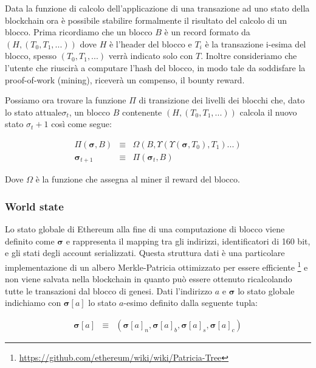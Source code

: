 	Data la funzione di calcolo dell'applicazione di una transazione ad uno stato della blockchain ora è possibile stabilire formalmente il risultato del calcolo di un blocco.
	Prima ricordiamo che un blocco $B$ è un record formato da $(H,(T_0,T_1,...))$ dove $H$ è l'header del blocco e $T_i$ è la transazione i-esima del blocco, spesso $(T_0,T_1,...)$ verrà indicato solo con $T$.
	Inoltre consideriamo che l'utente che riuscirà a computare l'hash del blocco, in modo tale da soddisfare la proof-of-work (mining), riceverà un compenso, il bounty reward.
	
	
	Possiamo ora trovare  la funzione $\Pi$ di transizione dei livelli dei blocchi che, dato lo stato attuale$\sigma_t$, un blocco $B$ contenente $(H,(T_0,T_1,...))$ calcola il nuovo stato $\sigma_t+1$ così come segue: 
	
	\begin{eqnarray}
		\Pi(\boldsymbol{\sigma}, B) & \equiv & \Omega(B, \Upsilon(\Upsilon(\boldsymbol{\sigma}, T_0), T_1) ...) \\
		\boldsymbol{\sigma}_{t+1} & \equiv & \Pi(\boldsymbol{\sigma}_t, B) 
	\end{eqnarray}
	
	Dove $\Omega$ è la funzione che assegna al miner il reward del blocco.
	
	
	\subsubsection{World state}
	Lo stato globale di Ethereum alla fine di una computazione di blocco viene definito come $\boldsymbol{\sigma}$ e rappresenta il mapping tra gli indirizzi, identificatori di 160 bit, e gli stati degli account serializzati. Questa struttura dati è una particolare implementazione di un albero Merkle-Patricia ottimizzato per essere efficiente \footnote{\url{https://github.com/ethereum/wiki/wiki/Patricia-Tree}} e non viene salvata nella blockchain in quanto può essere ottenuto ricalcolando tutte le transazioni dal blocco di genesi. 
	Dati l'indirizzo $a$  e $\boldsymbol{\sigma}$ lo stato globale indichiamo con $\boldsymbol{\sigma}[a]$ lo stato $a$-esimo definito dalla seguente tupla:
	
	\begin{eqnarray}
		\boldsymbol{\sigma}[a] & \equiv & (\boldsymbol{\sigma}[a]_n,\boldsymbol{\sigma}[a]_b,\boldsymbol{\sigma}[a]_s,\boldsymbol{\sigma}[a]_c)
	\end{eqnarray}
	
